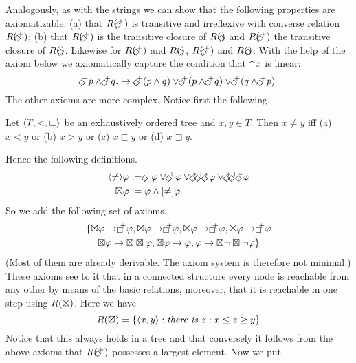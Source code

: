 Analogously, as with the strings we can show that the following
properties are axiomatizable: (a) that $R(\links^+)$
is transitive and irreflexive with converse relation
$R(\rechts^+)$; (b) that $R(\links^+)$ is the transitive
closure of $R(\links)$ and $R(\rechts^+)$ the transitive closure
of $R(\rechts)$. Likewise for $R(\oben^+)$ and $R(\oben)$,
$R(\unten^+)$ and $R(\unten)$. With the help of the axiom
below we axiomatically capture the condition that ${\uparrow\! x}$
is linear:
\begin{equation}
\oben^+ p \und \oben^+ q .\pf.
\oben^+ (p \und q) \oder \oben^+ (p \und \oben^+ q)
\oder \oben^+ (q \und \oben^+ p)
\end{equation}
The other axioms are more complex. Notice first the
following.
\begin{lem}
Let $\langle T, < , \sqsubset\rangle$ be an exhaustively ordered tree
and $x, y \in T$. Then $x \neq y$ iff
(a) $x < y$ or (b) $x > y$ or (c) $x \sqsubset y$ or
(d) $x \sqsupset y$.
\end{lem}
Hence the following definitions.
\begin{align}
\auf\neq\zu \varphi & := \oben^+ \varphi \oder \unten^+ \varphi
         \oder
    \oben^{\ast} \rechts^+ \unten^{\ast} \varphi
         \oder
    \oben^{\ast} \links^+ \unten^{\ast} \varphi \\
\master \varphi & := \varphi \und [\neq] \varphi
\end{align}
So we add the following set of axioms.
\begin{multline}
\{\master \varphi \pf \qrechts^+ \varphi,
\master \varphi \pf \qlinks^+ \varphi,  
\master \varphi \pf \qoben^+ \varphi,  
\master \varphi \pf \qunten^+ \varphi \\
\master \varphi \pf \master\master \varphi,  
\master \varphi \pf \varphi, 
\varphi \pf \master \nicht\master\nicht \varphi\}
\end{multline}
(Most of them are already derivable. The axiom system is therefore
not minimal.) These axioms see to it that in a connected structure 
every node is reachable from any other by means of the basic relations,
moreover, that it is reachable in one step using $R(\boxtimes)$.
Here we have
\begin{equation}
R(\boxtimes) =
\{\langle x,y\rangle : \mbox{\it there is \/} z:
x \leq z \geq y\}
\end{equation}
Notice that this always holds in a tree and that conversely it
follows from the above axioms that $R(\oben^+)$ possesses a
largest element. Now we put

